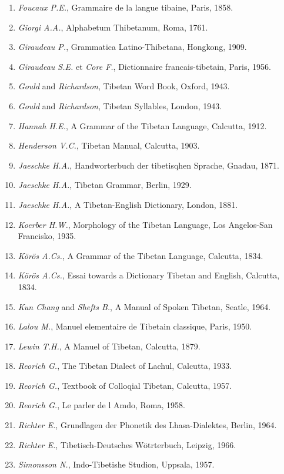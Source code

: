 \begin{enumerate}
	\item \emph{Foucaux P.E.}, Grammaire de la langue tibaine, Paris, 1858.
	\item \emph{Giorgi A.A.}, Alphabetum Thibetanum, Roma, 1761.
	\item \emph{Giraudeau P.}, Grammatica Latino-Thibetana, Hongkong, 1909.
	\item \emph{Giraudeau S.E.} et \emph{Core F.}, Dictionnaire francais-tibetain, Paris, 1956.
	\item \emph{Gould} and \emph{Richardson}, Tibetan Word Book, Oxford, 1943.
	\item \emph{Gould} and \emph{Richardson}, Tibetan Syllables, London, 1943.
	\item \emph{Hannah H.E.}, A Grammar of the Tibetan Language, Calcutta, 1912.
	\item \emph{Henderson V.C.}, Tibetan Manual, Calcutta, 1903.
	\item \emph{Jaeschke H.A.}, Handworterbuch der tibetisqhen Sprache, Gnadau, 1871.
	\item \emph{Jaeschke H.A.}, Tibetan Grammar, Berlin, 1929.
	\item \emph{Jaeschke H.A.}, A Tibetan-English Dictionary, London, 1881.
	\item \emph{Koerber H.W.}, Morphology of the Tibetan Language, Los Angelos-San Francisko, 1935.
	\item \emph{Körös A.Cs.}, A Grammar of the Tibetan Language, Calcutta, 1834.
	\item \emph{Körös A.Cs.}, Essai towards a Dictionary Tibetan and English, Calcutta, 1834.
	\item \emph{Kun Chang} and \emph{Shefts B.}, A Manual of Spoken Tibetan, Seatle, 1964.
	\item \emph{Lalou M.}, Manuel elementaire de Tibetain classique, Paris, 1950.
	\item \emph{Lewin T.H.}, A Manuel of Tibetan, Calcutta, 1879.
	\item \emph{Reorich G.}, The Tibetan Dialect of Lachul, Calcutta, 1933.
	\item \emph{Reorich G.}, Textbook of Colloqial Tibetan, Calcutta, 1957.
	\item \emph{Reorich G.}, Le parler de l Amdo, Roma, 1958.
	\item \emph{Richter E.}, Grundlagen der Phonetik des Lhasa-Dialektes, Berlin, 1964.
	\item \emph{Richter E.}, Tibetisch-Deutsches Wötrterbuch, Leipzig, 1966.
	\item \emph{Simonsson N.}, Indo-Tibetishe Studion, Uppsala, 1957.

\end{enumerate}
